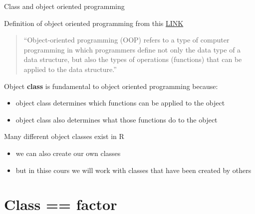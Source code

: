 \documentclass[8pt,ignorenonframetext,dvipsnames]{beamer}
\providecommand{\tightlist}{%
  \setlength{\itemsep}{0pt}\setlength{\parskip}{0pt}}
\renewcommand{\textbf}[1]{{\color{darkgray}\bfseries\fontfamily{Montserrat-TOsF}#1}}
\let\olditem\item
\renewcommand{\item}{%
  \olditem\vspace{4pt}
}
\begin{document}
\begin{frame}{Class and object oriented programming}

Definition of object oriented programming from this
\href{https://www.webopedia.com/TERM/O/object_oriented_programming_OOP.html}{LINK}

\begin{quote}
``Object-oriented programming (OOP) refers to a type of computer
programming in which programmers define not only the data type of a data
structure, but also the types of operations (functions) that can be
applied to the data structure.''
\end{quote}

Object \textbf{class} is fundamental to object oriented programming
because:

\begin{itemize}
\tightlist
\item
  object class determines which functions can be applied to the object
\item
  object class also determines what those functions do to the object
\end{itemize}

Many different object classes exist in R

\begin{itemize}
\tightlist
\item
  we can also create our own classes
\item
  but in thise cours we will work with classes that have been created by
  others
\end{itemize}

\end{frame}

\section{Class == factor}\label{class-factor}
\end{document}
